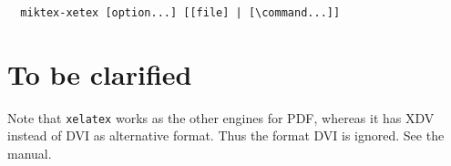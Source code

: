 \documentclass{article}
\newcommand{\lualatex}{\texttt{lualatex}}
\newcommand{\xelatex}{\texttt{xelatex}}
\newcommand{\texlive}{\TeX~Live}
\newcommand{\miktex}{MiKTeX}
\begin{document}


  
  
  

\begin{verbatim}
  miktex-xetex [option...] [[file] | [\command...]]
\end{verbatim}






\section{To be clarified}\label{sec:TBC}

Note that \xelatex{} works as the other engines for PDF, 
whereas it has XDV instead of DVI as alternative format. 
Thus the format DVI is ignored. 
See the manual. 



{}%
\end{document}
